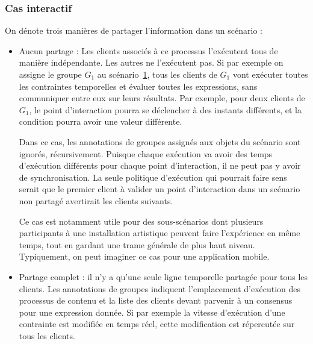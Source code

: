 \documentclass{article}
\newcommand\trigger{point d'interaction\xspace}
\begin{document}
\subsubsection{Cas interactif}
On dénote trois manières de partager l'information dans un scénario : 

\begin{itemize}
    \item Aucun partage : Les clients associés à ce processus l'exécutent tous de manière indépendante.
    Les autres ne l'exécutent pas. 
    Si par exemple on assigne le groupe $G_1$ au scénario~\ref{scenar.general}, tous les clients de $G_1$ vont exécuter toutes les contraintes temporelles et évaluer toutes les expressions, sans communiquer entre eux sur leurs résultats. 
    Par exemple, pour deux clients de $G_1$, le \trigger pourra se déclencher à des instants différents, et la condition pourra avoir une valeur différente.
    
    Dans ce cas, les annotations de groupes assignés aux objets du scénario sont ignorés, récursivement. 
    Puisque chaque exécution va avoir des temps d'exécution différents pour chaque point d'interaction, il ne peut pas y avoir de synchronisation.
    La seule politique d'exécution qui pourrait faire sens serait que le premier client à valider un \trigger dans un scénario non partagé avertirait les clients suivants.
    
    Ce cas est notamment utile pour des sous-scénarios dont plusieurs participants à une installation artistique peuvent faire l'expérience en même temps, tout en gardant une trame générale de plus haut niveau. 
    Typiquement, on peut imaginer ce cas pour une application mobile.
    
    \begin{figure}[h]
        \centering
        \begin{tikzpicture}
        
        \end{tikzpicture}
        \label{scenar.general}
    \end{figure}
    
    \item Partage complet : il n'y a qu'une seule ligne temporelle partagée pour tous les clients. 
    Les annotations de groupes indiquent l'emplacement d'exécution des processus de contenu et la liste des clients devant parvenir à un consensus pour une expression donnée. 
    Si par exemple la vitesse d'exécution d'une contrainte est modifiée en temps réel, cette modification est répercutée sur tous les clients.
    

\end{itemize}
\end{document}
